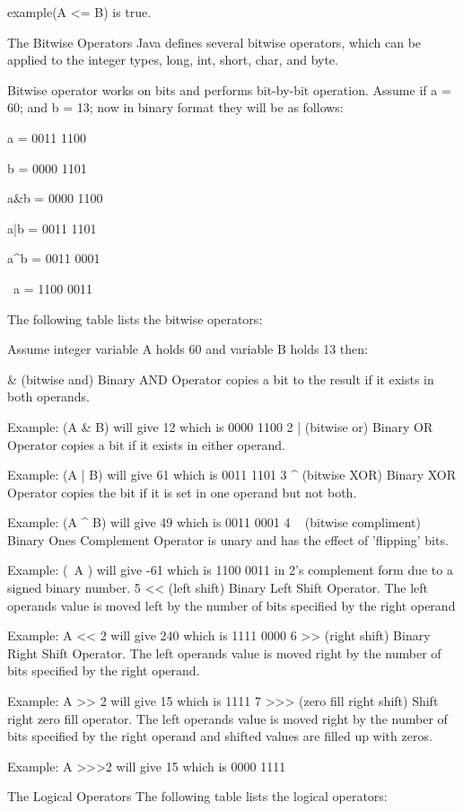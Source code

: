 example(A <= B) is true.

The Bitwise Operators
Java defines several bitwise operators, which can be applied to the integer types, long, int, short, char, and byte.

Bitwise operator works on bits and performs bit-by-bit operation. Assume if a = 60; and b = 13; now in binary format they will be as follows:

a = 0011 1100

b = 0000 1101

a&b = 0000 1100

a|b = 0011 1101

a^b = 0011 0001

~a = 1100 0011

The following table lists the bitwise operators:

Assume integer variable A holds 60 and variable B holds 13 then:

& (bitwise and) Binary AND Operator copies a bit to the result if it exists in both operands.

Example: (A & B) will give 12 which is 0000 1100 2 | (bitwise or) Binary OR Operator copies a bit if it exists in either operand.

Example: (A | B) will give 61 which is 0011 1101 3 ^ (bitwise XOR) Binary XOR Operator copies the bit if it is set in one operand but not both.

Example: (A ^ B) will give 49 which is 0011 0001 4 ~ (bitwise compliment) Binary Ones Complement Operator is unary and has the effect of 'flipping' bits.

Example: (~A ) will give -61 which is 1100 0011 in 2's complement form due to a signed binary number. 5 << (left shift) Binary Left Shift Operator. The left operands value is moved left by the number of bits specified by the right operand

Example: A << 2 will give 240 which is 1111 0000 6 >> (right shift) Binary Right Shift Operator. The left operands value is moved right by the number of bits specified by the right operand.

Example: A >> 2 will give 15 which is 1111 7 >>> (zero fill right shift) Shift right zero fill operator. The left operands value is moved right by the number of bits specified by the right operand and shifted values are filled up with zeros.

Example: A >>>2 will give 15 which is 0000 1111

The Logical Operators
The following table lists the logical operators:

